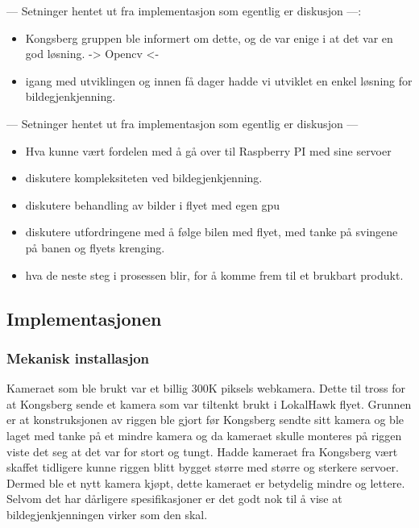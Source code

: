 --- Setninger hentet ut fra implementasjon som egentlig er diskusjon ---:
\begin{itemize}
\item Kongsberg gruppen ble informert om dette, og de var enige i at det var en god løsning. -> Opencv <-
\item igang med utviklingen og innen få dager hadde vi utviklet en enkel løsning for bildegjenkjenning.

\end {itemize}
--- Setninger hentet ut fra implementasjon som egentlig er diskusjon ---

\begin{itemize}
\item 
Hva kunne vært fordelen med å gå over til Raspberry PI med sine servoer

\item diskutere kompleksiteten ved bildegjenkjenning. 

\item diskutere behandling av bilder i flyet med egen gpu

\item diskutere utfordringene med å følge bilen med flyet, med tanke på svingene på banen og flyets krenging.

\item hva de neste steg i prosessen blir, for å komme frem til et brukbart produkt. 
\end{itemize}

\subsection{Implementasjonen}
 
\subsubsection{Mekanisk installasjon}

Kameraet som ble brukt var et billig 300K piksels webkamera. Dette til tross for at Kongsberg sende et kamera som var tiltenkt brukt i LokalHawk flyet. Grunnen er at konstruksjonen av riggen ble gjort før Kongsberg sendte sitt kamera og ble laget med tanke på et mindre kamera og da kameraet skulle monteres på riggen viste det seg at det var for stort og tungt. Hadde kameraet fra Kongsberg vært skaffet tidligere kunne riggen blitt bygget større med større og sterkere servoer. Dermed ble et nytt kamera kjøpt, dette kameraet er betydelig mindre og lettere. Selvom det har dårligere spesifikasjoner er det godt nok til å vise at bildegjenkjenningen virker som den skal.

